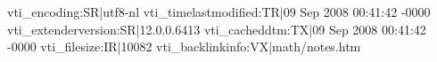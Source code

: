 vti_encoding:SR|utf8-nl
vti_timelastmodified:TR|09 Sep 2008 00:41:42 -0000
vti_extenderversion:SR|12.0.0.6413
vti_cacheddtm:TX|09 Sep 2008 00:41:42 -0000
vti_filesize:IR|10082
vti_backlinkinfo:VX|math/notes.htm
